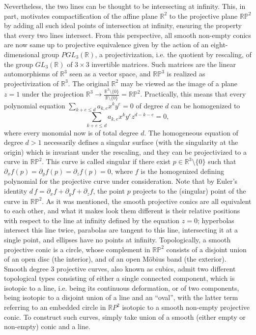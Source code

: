 \documentclass[pdflatex,sn-mathphys-num]{sn-jnl}%
\theoremstyle{thmstyleone}%
\theoremstyle{thmstyletwo}%
\theoremstyle{thmstylethree}%
\newcommand{\R}{\mathbb{R}}
\newcommand{\RP}{\mathbb{R}\mathbb{P}}
\begin{document}
Nevertheless, the two lines can be thought to be intersecting at infinity. This, in part, motivates compactification of the affine plane $\R^2$ to the projective plane $\RP^2$ by adding all such ideal points of intersection at infinity, ensuring the property that every two lines intersect. From this perspective, all smooth non-empty conics are now same up to projective equivalence given by the action of an  eight-dimensional group $PGL_3(\R)$, a projectivization, i.e. the quotient by rescaling, of the group $GL_3(\R)$ of $3\times 3$ invertible matrices. Such matrices are the linear automorphisms of $\R ^3$ seen as a vector space, and $\RP^3$ is realized as projectivization of $\R^3$. The original $\R^2$ may be viewed as the image of a plane $z=1$ under the projection $\R^3\longrightarrow\frac{\R^3\setminus \{0\}}{\R\setminus\{0\}}=\RP^2.$ Practically, this means that every polynomial equation $\displaystyle\sum_{k+e\leq d}^{} a_{k,e}x^ky^e=0$ of degree $d$ can be homogenized to$$\displaystyle\sum_{k+e\leq d} a_{k,e}x^ky^ez^{d-k-e}=0,$$ where every monomial now is of total degree $d$.   The homogeneous equation of degree $d>1$ necessarily defines a singular surface (with the singularity at the origin) which is invariant under the rescaling, and they can be projectivized to a curve in $\RP^2$. This curve is called singular if there exist $p\in\R^3\setminus\{0\}$ such that $\partial_xf(p)=\partial_yf(p)=\partial_zf(p)=0$,
where $f$ is the homogenized defining polynomial for the projective curve under consideration. Note that by Euler's identity
$d\,f=\partial_xf+\partial_yf+\partial_zf$, the point $p$ projects to the (singular) point of the curve in $\RP^2$. 
As it was mentioned, the smooth projective conics are all equivalent to each other, and what it makes look them different is their relative positions with respect to the line at infinity defined by the equation $z = 0$; hyperbolas intersect this line twice, parabolas are tangent to this line, intersecting it at a single point, and ellipses have no points at infinity. Topologically, a smooth projective conic is a circle, whose complement in $\RP^2$ consists of a disjoint union of an open disc (the interior), and of an open Möbius band (the exterior). Smooth degree 3 projective curves, also known as cubics, admit two different topological types consisting of either a single connected component, which is isotopic to a line, i.e. being its continuous  deformation, or of two components, being isotopic to a disjoint union of a line and an ``oval'', with the latter term referring to an embedded circle in $\mathbb{R}P^2$ isotopic to a smooth non-empty projective conic. To construct such curves, simply take union of a smooth (either empty or non-empty) conic and a line.
\end{document}
